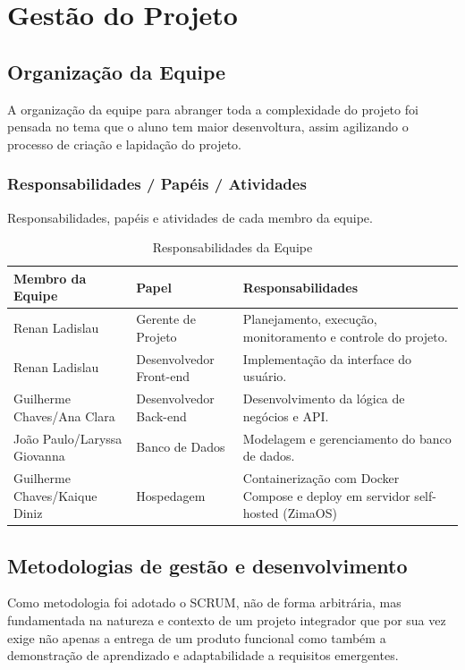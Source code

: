 \documentclass[
    12pt, 
    a4paper, 
    oneside, 
    chapter=TITLE, 
    section=TITLE
]{abntex2}
\begin{document}
\chapter{Gestão do Projeto}

\section{Organização da Equipe}
A organização da equipe para abranger toda a complexidade do projeto foi pensada no tema que o aluno tem maior desenvoltura, assim agilizando o processo de criação e lapidação do projeto.

\subsection{Responsabilidades / Papéis / Atividades}
Responsabilidades, papéis e atividades de cada membro da equipe.

\begin{table}[htb]
    \centering
    \caption{Responsabilidades da Equipe}
    \label{tab:equipe}
    \begin{tabular}{p{3cm} p{3.5cm} p{7cm}}
        \toprule
        \textbf{Membro da Equipe} & \textbf{Papel} & \textbf{Responsabilidades} \\
        \midrule
        Renan Ladislau & Gerente de Projeto & Planejamento, execução, monitoramento e controle do projeto. \\
        Renan Ladislau & Desenvolvedor Front-end & Implementação da interface do usuário. \\
        Guilherme Chaves/Ana Clara & Desenvolvedor Back-end & Desenvolvimento da lógica de negócios e API. \\
        João Paulo/Laryssa Giovanna & Banco de Dados & Modelagem e gerenciamento do banco de dados. \\
        Guilherme Chaves/Kaique Diniz & Hospedagem & Containerização com Docker Compose e deploy em servidor self-hosted (ZimaOS) \\
        \bottomrule
    \end{tabular}
\end{table}

\section{Metodologias de gestão e desenvolvimento}
Como metodologia foi adotado o SCRUM, não de forma arbitrária, mas fundamentada na natureza e contexto de um projeto integrador que por sua vez exige não apenas a entrega de um produto funcional como também a demonstração de aprendizado e adaptabilidade a requisitos emergentes.
\end{document}
